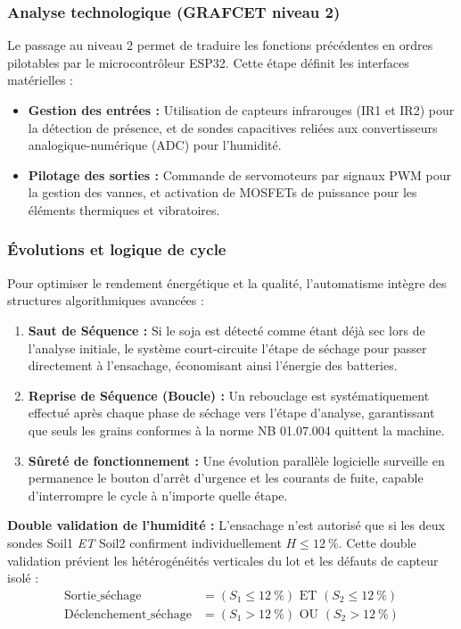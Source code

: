 \subsubsection{Analyse technologique (GRAFCET niveau 2)}

Le passage au niveau 2 permet de traduire les fonctions précédentes en ordres pilotables par le microcontrôleur ESP32. Cette étape définit les interfaces matérielles :
\begin{itemize}
    \item \textbf{Gestion des entrées :} Utilisation de capteurs infrarouges (IR1 et IR2) pour la détection de présence, et de sondes capacitives reliées aux convertisseurs analogique-numérique (ADC) pour l'humidité.
    \item \textbf{Pilotage des sorties :} Commande de servomoteurs par signaux PWM pour la gestion des vannes, et activation de MOSFETs de puissance pour les éléments thermiques et vibratoires.
\end{itemize}

\subsubsection{Évolutions et logique de cycle}

Pour optimiser le rendement énergétique et la qualité, l'automatisme intègre des structures algorithmiques avancées :
\begin{enumerate}
    \item \textbf{Saut de Séquence :} Si le soja est détecté comme étant déjà sec lors de l'analyse initiale, le système court-circuite l'étape de séchage pour passer directement à l'ensachage, économisant ainsi l'énergie des batteries.
    \item \textbf{Reprise de Séquence (Boucle) :} Un rebouclage est systématiquement effectué après chaque phase de séchage vers l'étape d'analyse, garantissant que seuls les grains conformes à la norme NB 01.07.004 quittent la machine.
    \item \textbf{Sûreté de fonctionnement :} Une évolution parallèle logicielle surveille en permanence le bouton d'arrêt d'urgence et les courants de fuite, capable d'interrompre le cycle à n'importe quelle étape.
\end{enumerate}

\FloatBarrier

\textbf{Double validation de l'humidité :} L'ensachage n'est autorisé que si les deux sondes Soil1 \textit{ET} Soil2 confirment individuellement $H \leq 12~\%$. Cette double validation prévient les hétérogénéités verticales du lot et les défauts de capteur isolé :
\begin{align*}
\text{Sortie\_séchage} &= (S_1 \leq 12~\%) \text{ ET } (S_2 \leq 12~\%) \\
\text{Déclenchement\_séchage} &= (S_1 > 12~\%) \text{ OU } (S_2 > 12~\%)
\end{align*}

